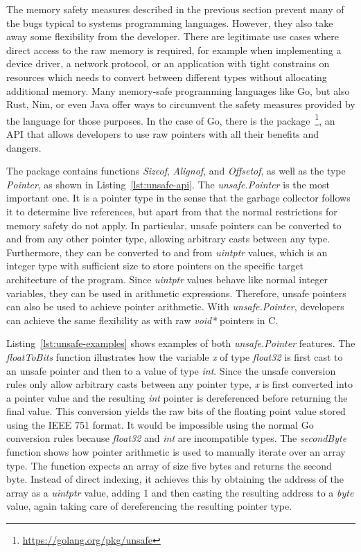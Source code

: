 The memory safety measures described in the previous section prevent many of the bugs typical to systems programming
languages.
However, they also take away some flexibility from the developer.
There are legitimate use cases where direct access to the raw memory is required, for example when implementing a
device driver, a network protocol, or an application with tight constrains on resources which needs to convert between
different types without allocating additional memory.
Many memory-safe programming languages like Go, but also Rust, Nim, or even Java offer ways to circumvent the safety
measures provided by the language for those purposes.
In the case of Go, there is the \unsafe{} package~\footnote{\url{https://golang.org/pkg/unsafe}}, an \acrshort{API} that
allows developers to use raw pointers with all their benefits and dangers.



The package contains  functions \textit{Sizeof}, \textit{Alignof}, and \textit{Offsetof}, as well as the
type \textit{Pointer}, as shown in Listing~\ref{lst:unsafe-api}.
The \textit{unsafe.Pointer} is the most important one.
It is a pointer type in the sense that the garbage collector follows it to determine live references, but apart from
that the normal restrictions for memory safety do not apply.
In particular, unsafe pointers can be converted to and from any other pointer type, allowing arbitrary casts between
any type.
Furthermore, they can be converted to and from \textit{uintptr} values, which is an integer type with sufficient size
to store pointers on the specific target architecture of the program.
Since \textit{uintptr} values behave like normal integer variables, they can be used in arithmetic expressions.
Therefore, unsafe pointers can also be used to achieve pointer arithmetic.
With \textit{unsafe.Pointer}, developers can achieve the same flexibility as with raw \textit{void*} pointers in C.

Listing~\ref{lst:unsafe-examples} shows examples of both \textit{unsafe.Pointer} features.
The \textit{floatToBits} function illustrates how the variable \textit{x} of type \textit{float32} is first cast to an
unsafe pointer and then to a value of type \textit{int}.
Since the unsafe conversion rules only allow arbitrary casts between any pointer type, \textit{x} is first converted
into a pointer value and the resulting \textit{int} pointer is dereferenced before returning the final value.
This conversion yields the raw bits of the floating point value stored using the IEEE 751 format.
It would be impossible using the normal Go conversion rules because \textit{float32} and \textit{int} are incompatible
types.
The \textit{secondByte} function shows how pointer arithmetic is used to manually iterate over an array type.
The function expects an array of size five bytes and returns the second byte.
Instead of direct indexing, it achieves this by obtaining the address of the array as a \textit{uintptr} value, adding
1 and then casting the resulting address to a \textit{byte} value, again taking care of dereferencing the resulting
pointer type.

